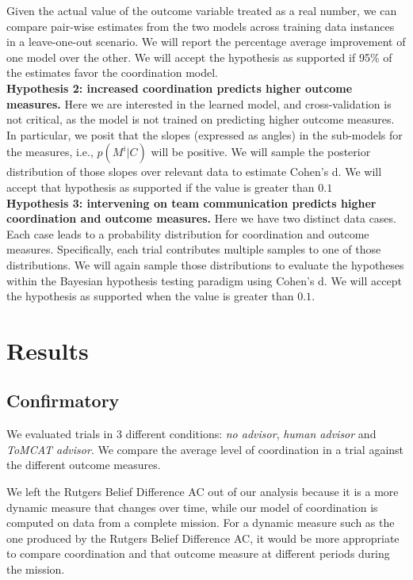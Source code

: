 Given the actual value of the outcome variable treated as a real number, we can
compare pair-wise estimates from the two models across training data instances
in a leave-one-out scenario. We will report the percentage average improvement
of one model over the other. We will accept the hypothesis as supported if 95\%
of the estimates favor the coordination model. \\

\noindent \textbf{Hypothesis 2: increased coordination predicts higher outcome measures.}
Here we are interested in the learned model, and cross-validation is not
critical, as the model is not trained on predicting higher outcome measures.  In
particular, we posit that the slopes (expressed as angles) in the sub-models for the measures, i.e.,
$p(M^i|C)$ will be positive. We will sample the posterior distribution of
those slopes over relevant data to estimate Cohen's d. We will accept that
hypothesis as supported if the value is greater than $0.1$ \\

\noindent \textbf{Hypothesis 3: intervening on team communication predicts
higher coordination and outcome measures.} Here we have two distinct data cases.
Each case leads to a probability distribution for coordination and outcome
measures.  Specifically, each trial contributes multiple samples to one of those
distributions. We will again sample those distributions to evaluate the hypotheses
within the Bayesian hypothesis testing paradigm using Cohen's d. We will accept
the hypothesis as supported when the value is greater than $0.1$.

\section{Results}

\subsection{Confirmatory}
We evaluated trials in 3 different conditions: \emph{no advisor}, \emph{human
advisor} and \emph{ToMCAT advisor}. We compare the average level of
coordination in a trial against the different outcome measures.

We left the Rutgers Belief Difference AC out of our analysis because it is a
more dynamic measure that changes over time, while our model of coordination is
computed on data from a complete mission. For a dynamic measure such
as the one produced by the Rutgers Belief Difference AC, it would be more
appropriate to compare coordination and that outcome measure at different
periods during the mission.

